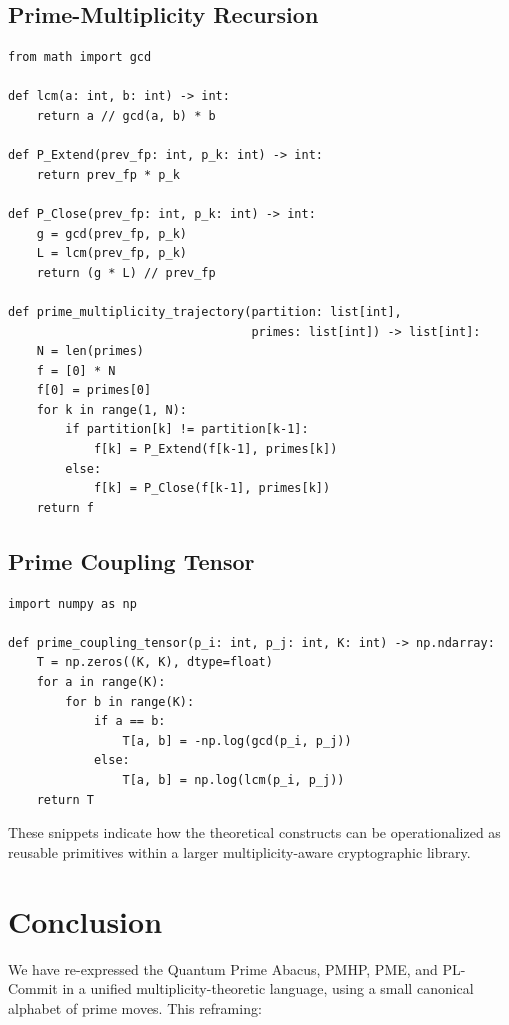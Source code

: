 \documentclass[11pt]{article}
\begin{document}
\subsection{Prime-Multiplicity Recursion}

\begin{verbatim}
from math import gcd

def lcm(a: int, b: int) -> int:
    return a // gcd(a, b) * b

def P_Extend(prev_fp: int, p_k: int) -> int:
    return prev_fp * p_k

def P_Close(prev_fp: int, p_k: int) -> int:
    g = gcd(prev_fp, p_k)
    L = lcm(prev_fp, p_k)
    return (g * L) // prev_fp

def prime_multiplicity_trajectory(partition: list[int],
                                  primes: list[int]) -> list[int]:
    N = len(primes)
    f = [0] * N
    f[0] = primes[0]
    for k in range(1, N):
        if partition[k] != partition[k-1]:
            f[k] = P_Extend(f[k-1], primes[k])
        else:
            f[k] = P_Close(f[k-1], primes[k])
    return f
\end{verbatim}

\subsection{Prime Coupling Tensor}

\begin{verbatim}
import numpy as np

def prime_coupling_tensor(p_i: int, p_j: int, K: int) -> np.ndarray:
    T = np.zeros((K, K), dtype=float)
    for a in range(K):
        for b in range(K):
            if a == b:
                T[a, b] = -np.log(gcd(p_i, p_j))
            else:
                T[a, b] = np.log(lcm(p_i, p_j))
    return T
\end{verbatim}

These snippets indicate how the theoretical constructs can be operationalized as reusable primitives within a larger multiplicity-aware cryptographic library.

\section{Conclusion}

We have re-expressed the Quantum Prime Abacus, PMHP, PME, and PL-Commit in a unified multiplicity-theoretic language, using a small canonical alphabet of prime moves. This reframing:
\end{document}
